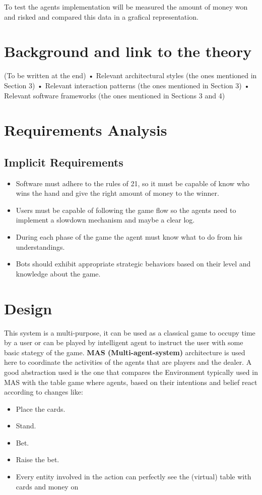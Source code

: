 To test the agents implementation will be measured the amount of money won and risked and compared this data in a grafical representation.

\chapter{Background and link to the theory}

(To be written at the end)
• Relevant architectural styles (the ones mentioned in Section 3)
• Relevant interaction patterns (the ones mentioned in Section 3)
• Relevant software frameworks (the ones mentioned in Sections 3 and 4)


\chapter{Requirements Analysis}

\section{Implicit Requirements}
\begin{itemize}
   \item Software must adhere to the rules of 21, so it must be capable of know who wins the hand and give the right amount of money to the winner.
   \item Users must be capable of following the game flow so the agents need to implement a slowdown mechanism and maybe a clear log.
   \item During each phase of the game the agent must know what to do from his understandings.
   \item Bots should exhibit appropriate strategic behaviors based on their level and knowledge about the game.
\end{itemize}

\chapter{Design}

This system is a multi-purpose, it can be used as a classical game to occupy time by a user or can be played by intelligent agent to instruct the user with some basic stategy of the game. \textbf{MAS (Multi-agent-system)} architecture is used here to coordinate the activities of the agents that are players and the dealer. A good abstraction used is the one that compares the Environment typically used in MAS with the table game where agents, based on their intentions and belief react according to changes like: 
\begin{itemize}
    \item Place the cards.
    \item Stand.
    \item Bet.
    \item Raise the bet.
    \item Every entity involved in the action can perfectly see the (virtual) table with cards and money on
 \end{itemize}


